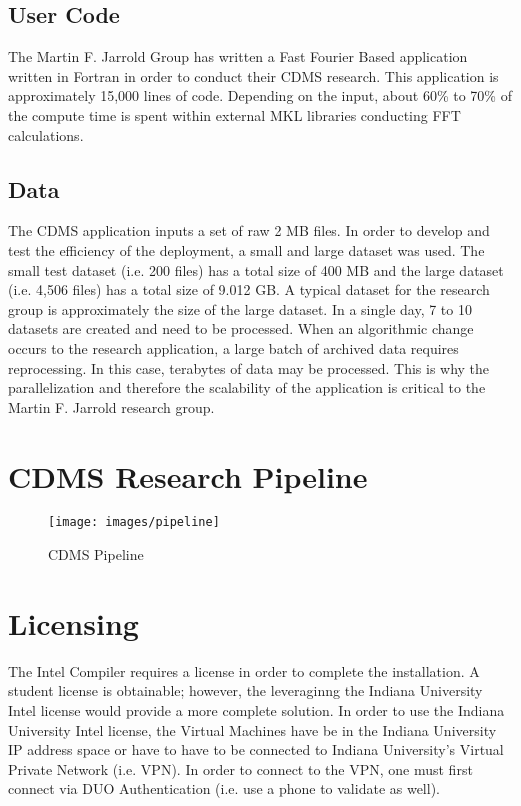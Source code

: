 \documentclass[9pt,twocolumn,twoside]{../../styles/osajnl}
\begin{document}
\subsection{User Code} \label{code}
The Martin F. Jarrold Group has written a Fast Fourier Based
application written in Fortran in order to conduct their CDMS
research. This application is approximately 15,000 lines of
code. Depending on the input, about 60\% to 70\% of the compute time
is spent within external MKL libraries conducting FFT calculations.

\subsection{Data} \label{data}
The CDMS application inputs a set of raw 2 MB files. In order to
develop and test the efficiency of the deployment, a small and large
dataset was used. The small test dataset (i.e. 200 files) has a total
size of 400 MB and the large dataset (i.e. 4,506 files) has a total
size of 9.012 GB. A typical dataset for the research group is
approximately the size of the large dataset. In a single day, 7 to 10
datasets are created and need to be processed. When an algorithmic
change occurs to the research application, a large batch of archived
data requires reprocessing. In this case, terabytes of data may be
processed. This is why the parallelization and therefore the
scalability of the application is critical to the Martin F. Jarrold
research group.  

\section{CDMS Research Pipeline} \label{cdms}
\begin{figure}
\centering
\texttt{[image: images/pipeline]}
\caption{CDMS Pipeline}
\end{figure}

\section{Licensing} \label{licensing}
The Intel Compiler requires a license in order to complete the
installation. A student license is obtainable; however, the
leveraginng the Indiana University Intel license would provide a more
complete solution. In order to use the Indiana University Intel
license, the Virtual Machines have be in the Indiana University IP
address space or have to have to be connected to Indiana University's
Virtual Private Network (i.e. VPN). In order to connect to the VPN,
one must first connect via DUO Authentication (i.e. use a phone to
validate as well). 
\end{document}
